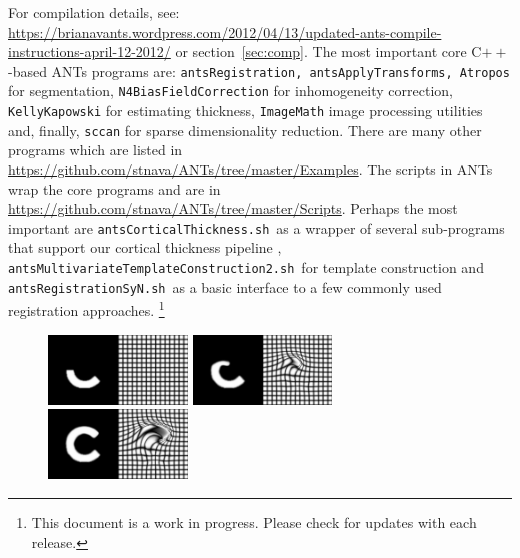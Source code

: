 \documentclass{InsightArticle}
\begin{document}
For compilation details, see:
\href{https://brianavants.wordpress.com/2012/04/13/updated-ants-compile-instructions-april-12-2012/}{https://brianavants.wordpress.com/2012/04/13/updated-ants-compile-instructions-april-12-2012/}
or section~\ref{sec:comp}.
The most important core C${++}$-based ANTs programs are: 
\texttt{antsRegistration, antsApplyTransforms, Atropos} for
segmentation, \texttt{N4BiasFieldCorrection} for
inhomogeneity correction,  \texttt{KellyKapowski} for estimating
thickness, \texttt{ImageMath} image processing utilities
and, finally, \texttt{sccan} for sparse dimensionality reduction.  There
are many other programs which are listed in
\href{https://github.com/stnava/ANTs/tree/master/Examples}{https://github.com/stnava/ANTs/tree/master/Examples}.
The scripts in ANTs wrap the core programs and are in
\href{https://github.com/stnava/ANTs/tree/master/Scripts}{https://github.com/stnava/ANTs/tree/master/Scripts}.
Perhaps the most important are \texttt{antsCorticalThickness.sh}~as a
wrapper of several sub-programs that support our
cortical thickness pipeline \cite{Tustison2014b}, \texttt{antsMultivariateTemplateConstruction2.sh}~for template construction
and \texttt{antsRegistrationSyN.sh}~as a basic interface to a few commonly used registration approaches.
\footnote{This document is a work in progress. Please check for updates with each release.}
\begin{figure}
\includegraphics[width=0.33\textwidth]{Figures/grid1100.pdf} 
\includegraphics[width=0.33\textwidth]{Figures/grid1110.pdf} 
\includegraphics[width=0.33\textwidth]{Figures/grid1119.pdf} 
\vspace{-0.1in}
\label{fig:chalf}
\end{figure}
\end{document}
